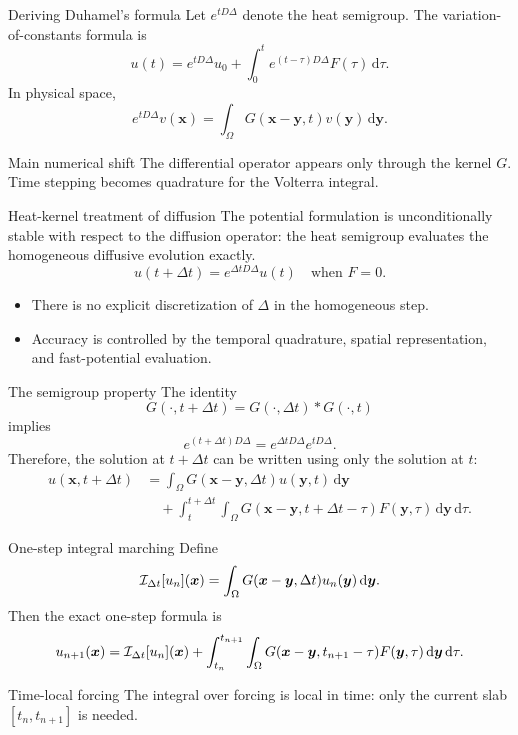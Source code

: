 \documentclass[aspectratio=169,10pt]{beamer}
\newcommand{\dd}{\,\mathrm d}
\newcommand{\x}{\bm{x}}
\newcommand{\y}{\bm{y}}
\newcommand{\dt}{\Delta t}
\begin{document}
\begin{frame}{Deriving Duhamel's formula}
\small
Let $e^{tD\Delta}$ denote the heat semigroup. The variation-of-constants formula is
\[
  u(t)=e^{tD\Delta}u_0+
  \int_0^t e^{(t-\tau)D\Delta}F(\tau)\dd\tau.
\]
In physical space,
\[
  e^{tD\Delta}v(\x)
  =\int_{\Omega}G(\x-\y,t)v(\y)\dd\y.
\]

\begin{block}{Main numerical shift}
The differential operator appears only through the kernel $G$.
Time stepping becomes quadrature for the Volterra integral.
\end{block}
\end{frame}

\begin{frame}{Heat-kernel treatment of diffusion}
\small
The potential formulation is unconditionally stable with respect to the
diffusion operator: the heat semigroup evaluates the homogeneous diffusive
evolution exactly.
\[
  u(t+\dt)=e^{\dt D\Delta}u(t)
  \quad\text{when } F=0.
\]

\begin{itemize}
  \item There is no explicit discretization of $\Delta$ in the homogeneous step.
  \item Accuracy is controlled by the temporal quadrature, spatial
  representation, and fast-potential evaluation.
\end{itemize}
\end{frame}

\begin{frame}{The semigroup property}
\small
The identity
\[
  G(\cdot,t+\dt)=G(\cdot,\dt)*G(\cdot,t)
\]
implies
\[
  e^{(t+\dt)D\Delta}=e^{\dt D\Delta}e^{tD\Delta}.
\]
Therefore, the solution at $t+\dt$ can be written using only the solution at $t$:
\[
\begin{aligned}
u(\x,t+\dt)
&=\int_{\Omega}G(\x-\y,\dt)u(\y,t)\dd\y\\
&\quad+\int_t^{t+\dt}\int_{\Omega}
G(\x-\y,t+\dt-\tau)F(\y,\tau)\dd\y\dd\tau .
\end{aligned}
\]
\end{frame}

\begin{frame}{One-step integral marching}
\small
Define
\[
  \Iop_{\dt}[u_n](\x)
  =\int_{\Omega}G(\x-\y,\dt)u_n(\y)\dd\y.
\]
Then the exact one-step formula is
\[
  u_{n+1}(\x)=\Iop_{\dt}[u_n](\x)
  +\int_{t_n}^{t_{n+1}}\int_{\Omega}
  G(\x-\y,t_{n+1}-\tau)F(\y,\tau)\dd\y\dd\tau.
\]

\begin{block}{Time-local forcing}
The integral over forcing is local in time: only the current slab
$[t_n,t_{n+1}]$ is needed.
\end{block}
\end{frame}
\end{document}
